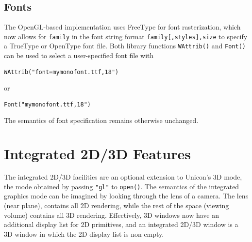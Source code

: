 \documentclass[letterpaper,12pt]{article}
\begin{document}
\subsection{Fonts}

The OpenGL-based implementation uses FreeType for font rasterization, which
now allows for \texttt{family} in the font string format 
\texttt{family[,styles],size} to specify a TrueType or OpenType font file.
Both library functions \texttt{WAttrib()} and \texttt{Font()} can be used
to select a user-specified font file with

\begin{verbatim}
WAttrib("font=mymonofont.ttf,18")
\end{verbatim}

\noindent
or

\begin{verbatim}
Font("mymonofont.ttf,18")
\end{verbatim}

\noindent 
The semantics of font specification remains otherwise unchanged.

\newpage
\section{Integrated 2D/3D Features}

The integrated 2D/3D facilities are an optional extension to 
Unicon's 3D mode, the mode obtained by passing \texttt{"gl"} to
\texttt{open()}. The
semantics of the integrated graphics mode can be imagined by looking through
the lens of a camera. The lens (near plane), contains all 2D rendering,
while the rest of the space (viewing volume) contains all 3D rendering.
Effectively, 3D windows now have an additional display list for 2D
primitives, and an integrated 2D/3D window is a 3D window in which the
2D display list is non-empty.
\end{document}
